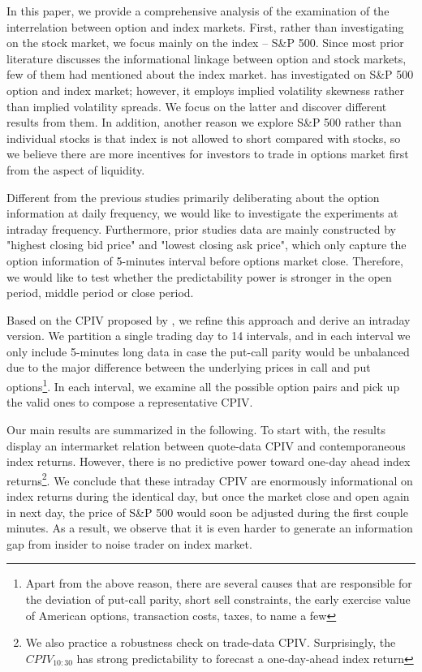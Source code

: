 In this paper, we provide a comprehensive analysis of the examination of the interrelation between option and index markets. First, rather than investigating on the stock market, we focus mainly on the index -- S\&P 500. Since most prior literature discusses the informational linkage between option and stock markets, few of them had mentioned about the index market. \textcite{atilgan2015implied} has investigated on S\&P 500 option and index market; however, it employs implied volatility skewness rather than implied volatility spreads. We focus on the latter and discover different results from them. In addition, another reason we explore S\&P 500 rather than individual stocks is that index is not allowed to short compared with stocks, so we believe there are more incentives for investors to trade in options market first from the aspect of liquidity.

Different from the previous studies primarily deliberating about the option information at daily frequency, we would like to investigate the experiments at intraday frequency. Furthermore, prior studies data are mainly constructed by "highest closing bid price" and "lowest closing ask price", which only capture the option information of 5-minutes interval before options market close. Therefore, we would like to test whether the predictability power is stronger in the open period, middle period or close period.
         
Based on the CPIV proposed by \textcite{cremers2010deviations}, we refine this approach and derive an intraday version. We partition a single trading day to 14 intervals, and in each interval we only include 5-minutes long data in case the put-call parity would be unbalanced due to the major difference between the underlying prices in call and put options\footnote{Apart from the above reason, there are several causes that are responsible for the deviation of put-call parity, short sell constraints, the early exercise value of American options, transaction costs, taxes, to name a few}. In each interval, we examine all the possible option pairs and pick up the valid ones to compose a representative CPIV.

Our main results are summarized in the following. To start with, the results display an intermarket relation between quote-data CPIV and contemporaneous index returns. However, there is no predictive power toward one-day ahead index returns\footnote{We also practice a robustness check on trade-data CPIV. Surprisingly, the $CPIV_{10:30}$ has strong predictability to forecast a one-day-ahead index return}. We conclude that these intraday CPIV are enormously informational on index returns during the identical day, but once the market close and open again in next day, the price of S\&P 500 would soon be adjusted during the first couple minutes. As a result, we observe that it is even harder to generate an information gap from insider to noise trader on index market.  

